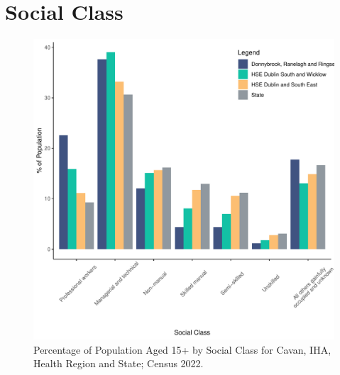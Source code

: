 \documentclass{article}
\begin{document}
\section{Social Class}\label{sect:SC}
\begin{figure}[H]
	\centering
	\includegraphics[width = 140mm]{../figures/SocialClassED.pdf}
	\caption{Percentage of Population Aged 15+ by Social Class for Cavan, IHA, Health Region and State; Census 2022.}
	\label{fig:vbnv}
	\end{figure}
\end{document}
